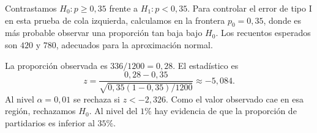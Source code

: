 Contrastamos $H_0:p\ge0{,}35$ frente a $H_1:p<0{,}35$. Para controlar el error de tipo I en esta prueba de cola izquierda, calculamos en la frontera $p_0=0{,}35$, donde es más probable observar una proporción tan baja bajo $H_0$. Los recuentos esperados son $420$ y $780$, adecuados para la aproximación normal.

La proporción observada es $336/1200=0{,}28$. El estadístico es
\[
z=\frac{0{,}28-0{,}35}{\sqrt{0{,}35(1-0{,}35)/1200}}\approx-5{,}084.
\]
Al nivel $\alpha=0{,}01$ se rechaza si $z<-2{,}326$. Como el valor observado cae en esa región, rechazamos $H_0$. Al nivel del $1\%$ hay evidencia de que la proporción de partidarios es inferior al $35\%$.
